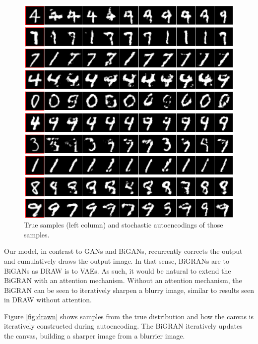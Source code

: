 \documentclass{article}
\begin{document}
\begin{figure}[h]
\caption{True samples (left column) and stochastic autoencodings of those samples.}
\label{fig:autoencoded}
\includegraphics[scale=0.3]{images/autoencoding.png}
\centering
\end{figure}

Our model, in contrast to GANs and BiGANs, recurrently corrects the output and cumulatively draws the output image. In that sense, BiGRANs are to BiGANs as DRAW is to VAEs. As such, it would be natural to extend the BiGRAN with an attention mechanism. Without an attention mechanism, the BiGRAN can be seen to iteratively sharpen a blurry image, similar to results seen in DRAW without attention.

Figure \ref{fig:drawn} shows samples from the true distribution and how the canvas is iteratively constructed during autoencoding. The BiGRAN iteratively updates the canvas, building a sharper image from a blurrier image.
 
\end{document}

